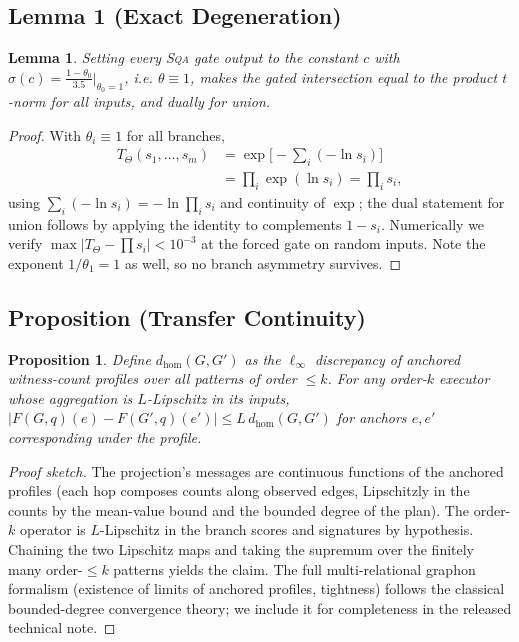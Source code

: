\documentclass[journal]{IEEEtran}
\newtheorem{lemma*}{Lemma}
\newtheorem{proposition*}{Proposition}
\begin{document}
\subsection*{Lemma 1 (Exact Degeneration)}

\begin{lemma*}
Setting every \textsc{Sqa}{} gate output to the constant $c$ with
$\sigma(c)=\tfrac{1-\theta_0}{3.5}\big|_{\theta_0=1}$, i.e.
$\theta\equiv1$, makes the gated intersection equal to the product
$t$-norm for all inputs, and dually for union.
\end{lemma*}
\begin{proof}
With $\theta_i\equiv 1$ for all branches,
\[
\begin{aligned}
T_\Theta(s_1,\dots,s_m) &=\exp\Big[-\sum_i(-\ln s_i)\Big]\\
&=\prod_i \exp(\ln s_i)=\prod_i s_i,
\end{aligned}
\]
using $\sum_i(-\ln s_i)=-\ln\prod_i s_i$ and continuity of $\exp$; the
dual statement for union follows by applying the identity to complements
$1-s_i$. Numerically we verify $\max|T_\Theta-\prod s_i|<10^{-3}$ at the
forced gate on random inputs. Note the exponent $1/\theta_1=1$ as well,
so no branch asymmetry survives.
\end{proof}

\subsection*{Proposition (Transfer Continuity)}

\begin{proposition*}
Define $d_{\mathrm{hom}}(G,G')$ as the $\ell_\infty$ discrepancy of
anchored witness-count profiles over all patterns of order $\le k$. For
any order-$k$ executor whose aggregation is $L$-Lipschitz in its inputs,
$|F(G,q)(e)-F(G',q)(e')|\le L\,d_{\mathrm{hom}}(G,G')$ for anchors $e,e'$
corresponding under the profile.
\end{proposition*}
\begin{proof}[Proof sketch]
The projection's messages are continuous functions of the anchored
profiles (each hop composes counts along observed edges, Lipschitzly in
the counts by the mean-value bound and the bounded degree of the plan).
The order-$k$ operator is $L$-Lipschitz in the branch scores and
signatures by hypothesis. Chaining the two Lipschitz maps and taking the
supremum over the finitely many order-$\le k$ patterns yields the claim.
The full multi-relational graphon formalism (existence of limits of
anchored profiles, tightness) follows the classical bounded-degree
convergence theory; we include it for completeness in the released
technical note.
\end{proof}
\end{document}
